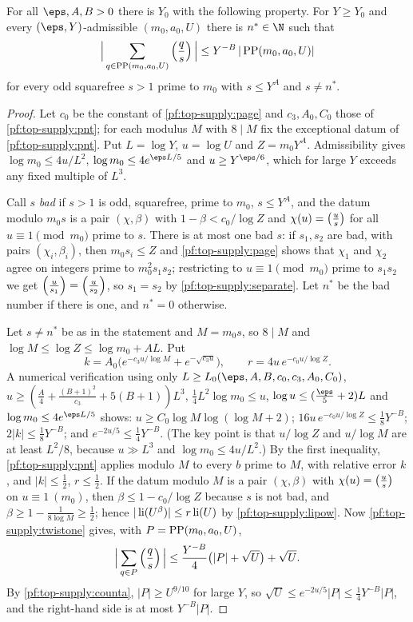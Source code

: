 \begin{proposition}\label{pf:top-supply:twistK}
For all $\eps,A,B>0$ there is $Y_0$ with the following property. For $Y\ge Y_0$ and every $(\eps,Y)$-admissible
$(m_0,a_0,U)$ there is $n^*\in\N$ such that
\[
\Big|\sum_{q\in\operatorname{PP}(m_0,a_0,U)}\left(\frac{q}{s}\right)\Big|\le Y^{-B}\,|\operatorname{PP}(m_0,a_0,U)|
\]
for every odd squarefree $s>1$ prime to $m_0$ with $s\le Y^A$ and $s\ne n^*$.
 
\end{proposition}

\begin{proof}
Let $c_0$ be the constant of \cref{pf:top-supply:page} and $c_3,A_0,C_0$ those of \cref{pf:top-supply:pnt}; for each
modulus $M$ with $8\mid M$ fix the exceptional datum of \cref{pf:top-supply:pnt}. Put $L=\log Y$, $u=\log U$ and
$Z=m_0Y^A$. Admissibility gives $\log m_0\le4u/L^2$, $\log m_0\le4e^{\eps L/5}$ and $u\ge Y^{\eps/6}$, which for large
$Y$ exceeds any fixed multiple of $L^3$.

Call $s$ \emph{bad} if $s>1$ is odd, squarefree, prime to $m_0$, $s\le Y^A$, and the datum modulo $m_0s$ is a pair
$(\chi,\beta)$ with $1-\beta<c_0/\log Z$ and $\chi(u)=\left(\frac{u}{s}\right)$ for all $u\equiv1\pmod{m_0}$ prime to $s$. There
is at most one bad $s$: if $s_1,s_2$ are bad, with pairs $(\chi_i,\beta_i)$, then $m_0s_i\le Z$ and
\cref{pf:top-supply:page} shows that $\chi_1$ and $\chi_2$ agree on integers prime to $m_0^2s_1s_2$; restricting to
$u\equiv1\pmod{m_0}$ prime to $s_1s_2$ we get $\left(\frac{u}{s_1}\right)=\left(\frac{u}{s_2}\right)$, so $s_1=s_2$ by
\cref{pf:top-supply:separate}. Let $n^*$ be the bad number if there is one, and $n^*=0$ otherwise.

Let $s\ne n^*$ be as in the statement and $M=m_0s$, so $8\mid M$ and $\log M\le\log Z\le\log m_0+AL$. Put
\[
k=A_0\big(e^{-c_3u/\log M}+e^{-\sqrt{c_3u}}\big),\qquad r=4u\,e^{-c_0u/\log Z}.
\]
A numerical verification using only $L\ge L_0(\eps,A,B,c_0,c_3,A_0,C_0)$, $u\ge(\frac A4+\frac{(B+1)^2}{c_3}+5(B+1))L^3$,
$\frac14L^2\log m_0\le u$, $\log u\le(\frac\eps5+2)L$ and $\log m_0\le4e^{\eps L/5}$
 shows: $u\ge C_0\log M\log(\log M+2)$; $16u\,e^{-c_0u/\log Z}\le\frac18Y^{-B}$;
$2|k|\le\frac18Y^{-B}$; and $e^{-2u/5}\le\frac14Y^{-B}$. (The key point is that $u/\log Z$ and $u/\log M$ are at
least $L^2/8$, because $u\gg L^3$ and $\log m_0\le4u/L^2$.) By the first inequality, \cref{pf:top-supply:pnt} applies
modulo $M$ to every $b$ prime to $M$, with relative error $k$, and $|k|\le\frac12$, $r\le\frac12$. If the datum modulo
$M$ is a pair $(\chi,\beta)$ with $\chi(u)=\left(\frac{u}{s}\right)$ on $u\equiv1\ (m_0)$, then $\beta\le1-c_0/\log Z$ because $s$
is not bad, and $\beta\ge1-\frac1{8\log M}\ge\frac12$; hence $|\operatorname{li}(U^\beta)|\le r\operatorname{li}(U)$ by
\cref{pf:top-supply:lipow}. Now \cref{pf:top-supply:twistone} gives, with $P=\operatorname{PP}(m_0,a_0,U)$,
\[
\Big|\sum_{q\in P}\left(\frac{q}{s}\right)\Big|\le\frac{Y^{-B}}4\big(|P|+\sqrt U\big)+\sqrt U.
\]
By \cref{pf:top-supply:counta}, $|P|\ge U^{9/10}$ for large $Y$, so $\sqrt U\le e^{-2u/5}|P|\le\frac14Y^{-B}|P|$, and
the right-hand side is at most $Y^{-B}|P|$.
\end{proof}

